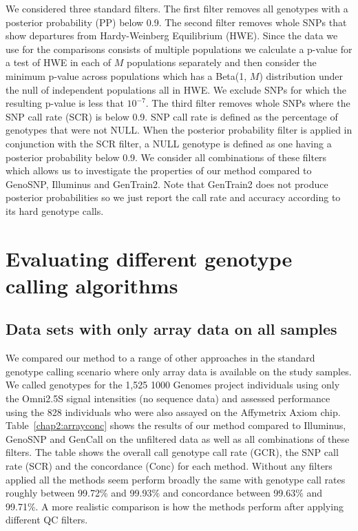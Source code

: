 We considered three standard filters. The first filter removes all genotypes with a posterior probability (PP) below 0.9. The second filter removes whole SNPs that show departures from Hardy-Weinberg Equilibrium (HWE). Since the data we use for the comparisons consists of multiple populations we calculate a p-value for a test of HWE in each of $M$ populations separately and then consider the minimum p-value across populations which has a Beta(1, $M$) distribution under the null of independent populations all in HWE. We exclude SNPs for which the resulting p-value is less that $10^{-7}$. The third filter removes whole SNPs where the SNP call rate (SCR) is below 0.9. SNP call rate is defined as the percentage of genotypes that were not NULL.  When the posterior probability filter is applied in conjunction with the SCR filter, a NULL genotype is defined as one having a posterior probability below 0.9. We consider all combinations of these filters which allows us to investigate the properties of our method compared to GenoSNP, Illuminus and GenTrain2. Note that GenTrain2 does not produce posterior probabilities so we just report the call rate and accuracy according to its hard genotype calls.


\clearpage
\section{Evaluating different genotype calling algorithms}
\label{chap2:results:comparison}

\subsection{Data sets with only array data on all samples} 

We compared our method to a range of other approaches  in the standard genotype calling scenario where only array data is available on the study samples. We called genotypes for the 1,525 1000 Genomes project individuals using only the Omni2.5S signal intensities (no sequence data) and assessed performance using the 828 individuals who were also assayed on the Affymetrix Axiom chip.  Table~\ref{chap2:arrayconc} shows the results of our method compared to Illuminus, GenoSNP and GenCall on the unfiltered data as well as all combinations of these filters. The table shows the overall call genotype call rate (GCR), the SNP call rate (SCR) and the concordance (Conc) for each method. Without any filters applied all the methods seem perform broadly the same with genotype call rates roughly between 99.72\% and 99.93\% and concordance between 99.63\% and 99.71\%. A more realistic comparison is how the methods perform after applying different QC filters.


